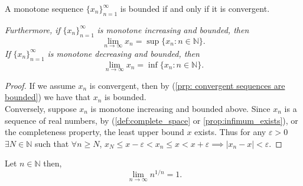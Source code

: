 \documentclass[../main.tex]{subfiles}
\begin{document}
    
    
    
    
    
    
    
    
    
    \begin{theorem} \label{thm: monotone convergence theorem}
    A monotone sequence \(\{x_n\}_{n=1}^{\infty}\) is bounded if and only if it is convergent.
    
    \textit{Furthermore, if} \(\{x_n\}_{n=1}^{\infty}\) \textit{is monotone increasing and bounded, then}
    \[
    \lim_{n \to \infty} x_n = \sup \{x_n : n \in \mathbb{N} \}.
    \]
    \textit{If} \(\{x_n\}_{n=1}^{\infty}\) \textit{is monotone decreasing and bounded, then}
    \[
    \lim_{n \to \infty} x_n = \inf \{x_n : n \in \mathbb{N} \}.
    \]
    \end{theorem}
    
    
\begin{proof}
If we assume $x_n$ is convergent, then by (\ref{prp: convergent sequences are bounded}) we have that $x_n$ is bounded.
\\ \indent Conversely, suppose $x_n$ is monotone increasing and bounded above.
Since $x_n$ is a sequence of real numbers, by (\ref{def:complete_space} or \ref{prop:infimum_exists}), or the completeness property, the least upper bound $x$ exists.
Thus for any $\varepsilon > 0$ $ \exists N \in \mathbb{N}$ such that  $\forall n \geq N$,  $x_N \leq x - \varepsilon < x_n \leq x < x + \varepsilon \implies |x_n - x| < \varepsilon $.
\end{proof}
    
    
    
    
    
    
    
    
    
    
    
    
    \begin{exercise} \label{ex: nth root limit}
    Let \(n \in \mathbb{N}\) then,
    \[
    \ \lim_{n \to \infty}{n^{1/n}} = 1.
    \]
    \end{exercise}
    
    
    
\end{document}

